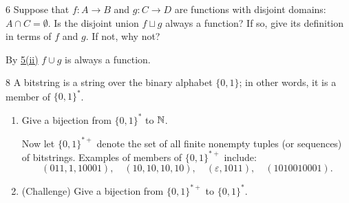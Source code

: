 \documentclass[11pt]{article}
\begin{document}
\begin{exercise}{6}
    Suppose that $f: A\to B$ and $g: C\to D$ are functions with
    disjoint domains: $A\cap C=\emptyset$. Is the disjoint union
    $f\sqcup g$ always a function? If so, give its definition in
    terms of $f$ and $g$. If not, why not?
\end{exercise}
\begin{solution}
    By \hyperref[5ii]{5(ii)} $f \cup g $ is always a function.
\end{solution}

\begin{exercise}{8}
    A bitstring is a string over the binary alphabet $\{0,1\}$; in
    other words, it is a member of $\{0,1\}^*$.
    \begin{enumerate}[label=(\alph*)]
        \item Give a bijection from $\{0,1\}^*$ to $\mathbb{N}$.

        Now let $\{0,1\}^{*+}$ denote the set of all finite nonempty
        tuples (or sequences) of bitstrings. Examples of members of
        $\{0,1\}^{*+}$ include:
        \[
            (011,1,10001),\quad (10,10,10,10),\quad (\varepsilon,
            1011),\quad (1010010001).
        \]
        \item (Challenge) Give a bijection from $\{0,1\}^{*+}$ to
        $\{0,1\}^*$.
    \end{enumerate}
\end{exercise}
\end{document}

